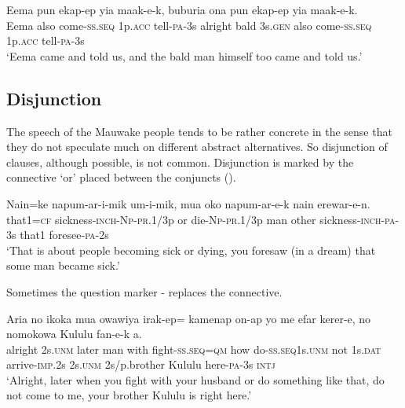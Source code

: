 \ea%
\label{ex:8:x1380}
\gll Eema  pun  ekap-ep  yia  maak-e-k,    buburia  ona pun  ekap-ep  yia  maak-e-k. \\
Eema  also  come-\textsc{ss}.\textsc{seq}  1p.\textsc{acc}  tell-\textsc{pa}-3s  alright  bald  3s.\textsc{gen} also  come-\textsc{ss}.\textsc{seq}  1p.\textsc{acc}  tell-\textsc{pa}-3s     \\
\glt`Eema came and told us, and the bald man himself too came and told us.'
\z


\subsection{Disjunction} \label{sec:8.1.2}

The speech of the Mauwake people tends to be rather concrete in the sense that they do not speculate much on different abstract alternatives. So disjunction of clauses, although possible, is not common. Disjunction is marked by the connective  `or' placed between the conjuncts (). 

\ea%
\label{ex:8:x1385}
\gll Nain=ke  napum-ar-i-mik    um-i-mik,  mua  oko napum-ar-e-k  nain  erewar-e-n. \\
that1=\textsc{cf}  sickness-\textsc{inch}-\textsc{Np}-\textsc{pr}.1/3p  or  die-\textsc{Np}-\textsc{pr}.1/3p  man  other sickness-\textsc{inch}-\textsc{pa}-3s  that1  foresee-\textsc{pa}-2s     \\
\glt`That is about people becoming sick or dying, you foresaw (in a dream) that some man became sick.'
\z


Sometimes the question marker -  replaces the connective.

\ea%
\label{ex:8:x1387}
\gll Aria  no  ikoka  mua  owawiya  irak-ep=  kamenap  on-ap  yo  me  efar  kerer-e,  no nomokowa  Kululu  fan-e-k  a.\\
 alright  2s.\textsc{unm}  later  man  with  fight-\textsc{ss}.\textsc{seq}=\textsc{qm}  how do-\textsc{ss}.\textsc{seq}1s.\textsc{unm}  not  1s.\textsc{dat}  arrive-\textsc{imp}.2s  2s.\textsc{unm} 2s/p.brother  Kululu  here-\textsc{pa}-3s  \textsc{intj}\\
\glt`Alright, later when you fight with your husband or do something like that, do not come to me, your brother Kululu is right here.'
\z



